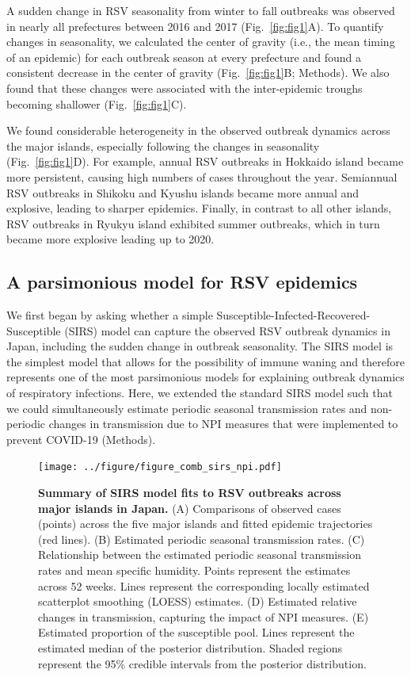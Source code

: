 \documentclass[12pt]{article}
\newcommand{\fref}[1]{Fig.~\ref{fig:#1}}
\begin{document}
A sudden change in RSV seasonality from winter to fall outbreaks was observed in nearly all prefectures between 2016 and 2017 (\fref{fig1}A).
To quantify changes in seasonality, we calculated the center of gravity (i.e., the mean timing of an epidemic) for each outbreak season at every prefecture and found a consistent decrease in the center of gravity (\fref{fig1}B; Methods). 
We also found that these changes were associated with the inter-epidemic troughs becoming shallower (\fref{fig1}C).

We found considerable heterogeneity in the observed outbreak dynamics across the major islands, especially following the changes in seasonality (\fref{fig1}D).
For example, annual RSV outbreaks in Hokkaido island became more persistent, causing high numbers of cases throughout the year.
Semiannual RSV outbreaks in Shikoku and Kyushu islands became more annual and explosive, leading to sharper epidemics.
Finally, in contrast to all other islands, RSV outbreaks in Ryukyu island exhibited summer outbreaks, which in turn became more explosive leading up to 2020.

\subsection*{A parsimonious model for RSV epidemics}

We first began by asking whether a simple Susceptible-Infected-Recovered-Susceptible (SIRS) model can capture the observed RSV outbreak dynamics in Japan, including the sudden change in outbreak seasonality.
The SIRS model is the simplest model that allows for the possibility of immune waning and therefore represents one of the most parsimonious models for explaining outbreak dynamics of respiratory infections.
Here, we extended the standard SIRS model such that we could simultaneously estimate periodic seasonal transmission rates and non-periodic changes in transmission due to NPI measures that were implemented to prevent COVID-19  (Methods).

\begin{figure}[!th]
\texttt{[image: ../figure/figure\_comb\_sirs\_npi.pdf]}
\caption{
\textbf{Summary of SIRS model fits to RSV outbreaks across major islands in Japan.}
(A) Comparisons of observed cases (points) across the five major islands and fitted epidemic trajectories (red lines).
(B) Estimated periodic seasonal transmission rates.
(C) Relationship between the estimated periodic seasonal transmission rates and mean specific humidity.
Points represent the estimates across 52 weeks.
Lines represent the corresponding locally estimated scatterplot smoothing (LOESS) estimates.
(D) Estimated relative changes in transmission, capturing the impact of NPI measures.
(E) Estimated proportion of the susceptible pool.
Lines represent the estimated median of the posterior distribution.
Shaded regions represent the 95\% credible intervals from the posterior distribution.
}
\label{fig:fig2}
\end{figure}
\end{document}

